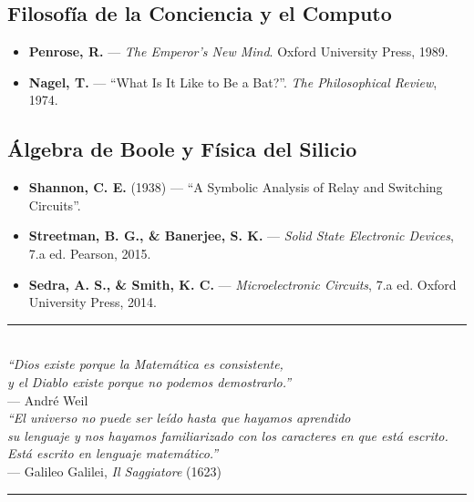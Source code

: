 \documentclass[11pt, letterpaper]{article}
\begin{document}
\subsection*{Filosof\'ia de la Conciencia y el Computo}
\begin{itemize}
  \item \textbf{Penrose, R.} --- \emph{The Emperor's New Mind}. Oxford University Press, 1989.
  \item \textbf{Nagel, T.} --- ``What Is It Like to Be a Bat?''. \textit{The Philosophical Review}, 1974.
\end{itemize}

\subsection*{\'Algebra de Boole y F\'isica del Silicio}
\begin{itemize}
  \item \textbf{Shannon, C. E.} (1938) --- ``A Symbolic Analysis of Relay and Switching Circuits''.
  \item \textbf{Streetman, B. G., \& Banerjee, S. K.} --- \emph{Solid State Electronic Devices}, 7.a ed. Pearson, 2015. 
  \item \textbf{Sedra, A. S., \& Smith, K. C.} --- \emph{Microelectronic Circuits}, 7.a ed. Oxford University Press, 2014. 
\end{itemize}

\vspace{2cm}

\begin{center}
\textcolor{mitred}{\rule{0.5\linewidth}{0.6pt}}\\[0.4em]
{\small\itshape ``Dios existe porque la Matem\'atica es consistente,\\
y el Diablo existe porque no podemos demostrarlo.''}\\[0.3em]
{\footnotesize --- Andr\'e Weil}\\[0.8em]
{\small\itshape ``El universo no puede ser le\'ido hasta que hayamos aprendido\\
su lenguaje y nos hayamos familiarizado con los caracteres en que est\'a escrito.\\
Est\'a escrito en lenguaje matem\'atico.''}\\[0.3em]
{\footnotesize --- Galileo Galilei, \textit{Il Saggiatore} (1623)}\\
\textcolor{mitred}{\rule{0.5\linewidth}{0.6pt}}
\end{center}
\end{document}
